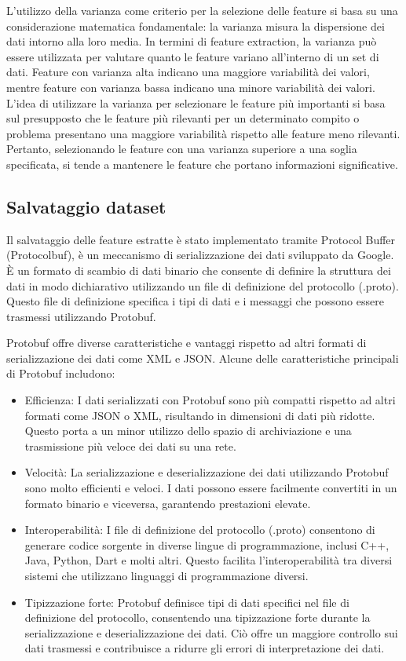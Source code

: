 \documentclass[a4paper,12pt]{report}
\begin{document}
      L'utilizzo della varianza come criterio per la selezione delle feature si basa su una considerazione matematica fondamentale:
      la varianza misura la dispersione dei dati intorno alla loro media.
      In termini di feature extraction, la varianza può essere utilizzata 
      per valutare quanto le feature variano all'interno di un set di dati.
      Feature con varianza alta indicano una maggiore variabilità dei valori,
      mentre feature con varianza bassa indicano una minore variabilità dei valori.
      L'idea di utilizzare la varianza per selezionare le feature 
      più importanti si basa sul presupposto che le feature più rilevanti 
      per un determinato compito o problema presentano una maggiore variabilità rispetto alle feature meno rilevanti.
      Pertanto, selezionando le feature con una varianza superiore a una soglia specificata, 
      si tende a mantenere le feature che portano informazioni significative.

      \subsection{Salvataggio dataset}
      Il salvataggio delle feature estratte è stato implementato tramite Protocol Buffer (Protocolbuf),
      è un meccanismo di serializzazione dei dati sviluppato da Google.
      È un formato di scambio di dati binario che consente di definire la struttura 
      dei dati in modo dichiarativo utilizzando un file di definizione del protocollo (.proto).
      Questo file di definizione specifica i tipi di dati e i messaggi che possono essere trasmessi utilizzando Protobuf.

      Protobuf offre diverse caratteristiche e vantaggi rispetto ad altri formati di serializzazione dei dati come XML e JSON.
      Alcune delle caratteristiche principali di Protobuf includono:
      \begin{itemize}
        \item Efficienza: I dati serializzati con Protobuf sono più compatti rispetto ad altri formati come JSON o XML, risultando in dimensioni di dati più ridotte. Questo porta a un minor utilizzo dello spazio di archiviazione e una trasmissione più veloce dei dati su una rete.
        \newpage
        \item Velocità: La serializzazione e deserializzazione dei dati utilizzando Protobuf sono molto efficienti e veloci. I dati possono essere facilmente convertiti in un formato binario e viceversa, garantendo prestazioni elevate.
        \item Interoperabilità: I file di definizione del protocollo (.proto) consentono di generare codice sorgente in diverse lingue di programmazione, inclusi C++, Java, Python, Dart e molti altri. Questo facilita l'interoperabilità tra diversi sistemi che utilizzano linguaggi di programmazione diversi.
        \item Tipizzazione forte: Protobuf definisce tipi di dati specifici nel file di definizione del protocollo, consentendo una tipizzazione forte durante la serializzazione e deserializzazione dei dati. Ciò offre un maggiore controllo sui dati trasmessi e contribuisce a ridurre gli errori di interpretazione dei dati.
      \end{itemize}
\end{document}
